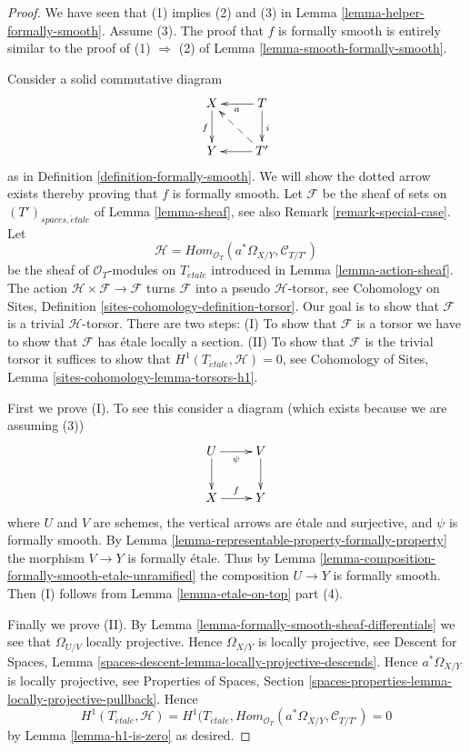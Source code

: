 \begin{proof}
We have seen that (1) implies (2) and (3) in
Lemma \ref{lemma-helper-formally-smooth}.
Assume (3).
The proof that $f$ is formally smooth is entirely similar to
the proof of (1) $\Rightarrow$ (2) of
Lemma \ref{lemma-smooth-formally-smooth}.

\medskip\noindent
Consider a solid commutative diagram
$$
\xymatrix{
X \ar[d]_f & T \ar[d]^i \ar[l]^a \\
Y & T' \ar[l] \ar@{-->}[lu]
}
$$
as in Definition \ref{definition-formally-smooth}.
We will show the dotted arrow exists thereby
proving that $f$ is formally smooth.
Let $\mathcal{F}$ be the sheaf of sets on $(T')_{spaces, \acute{e}tale}$ of
Lemma \ref{lemma-sheaf},
see also
Remark \ref{remark-special-case}.
Let
$$
\mathcal{H} =
\textit{Hom}_{\mathcal{O}_T}(a^*\Omega_{X/Y}, \mathcal{C}_{T/T'})
$$
be the sheaf of $\mathcal{O}_T$-modules on $T_{\acute{e}tale}$ introduced in
Lemma \ref{lemma-action-sheaf}.
The action $\mathcal{H} \times \mathcal{F} \to \mathcal{F}$
turns $\mathcal{F}$ into a pseudo $\mathcal{H}$-torsor, see
Cohomology on Sites, Definition \ref{sites-cohomology-definition-torsor}.
Our goal is to show that $\mathcal{F}$ is a trivial $\mathcal{H}$-torsor.
There are two steps: (I) To show that $\mathcal{F}$ is a torsor
we have to show that $\mathcal{F}$ has \'etale locally a
section. (II) To show that $\mathcal{F}$ is the trivial torsor
it suffices to show that $H^1(T_{\acute{e}tale}, \mathcal{H}) = 0$, see
Cohomology of Sites, Lemma \ref{sites-cohomology-lemma-torsors-h1}.

\medskip\noindent
First we prove (I). To see this consider a diagram
(which exists because we are assuming (3))
$$
\xymatrix{
U \ar[d] \ar[r]_\psi & V \ar[d] \\
X \ar[r]^f & Y
}
$$
where $U$ and $V$ are schemes, the vertical arrows are \'etale and
surjective, and $\psi$ is formally smooth. By 
Lemma \ref{lemma-representable-property-formally-property}
the morphism $V \to Y$ is formally \'etale. Thus by
Lemma \ref{lemma-composition-formally-smooth-etale-unramified}
the composition $U \to Y$ is formally smooth. Then (I) follows from
Lemma \ref{lemma-etale-on-top} part (4).

\medskip\noindent
Finally we prove (II). By
Lemma \ref{lemma-formally-smooth-sheaf-differentials}
we see that $\Omega_{U/V}$ locally projective.
Hence $\Omega_{X/Y}$ is locally projective, see
Descent for Spaces,
Lemma \ref{spaces-descent-lemma-locally-projective-descends}.
Hence $a^*\Omega_{X/Y}$ is locally projective, see
Properties of Spaces,
Section \ref{spaces-properties-lemma-locally-projective-pullback}.
Hence
$$
H^1(T_{\acute{e}tale}, \mathcal{H}) =
H^1(T_{\acute{e}tale},
\textit{Hom}_{\mathcal{O}_T}(a^*\Omega_{X/Y}, \mathcal{C}_{T/T'}) = 0
$$
by
Lemma \ref{lemma-h1-is-zero}
as desired.
\end{proof}

